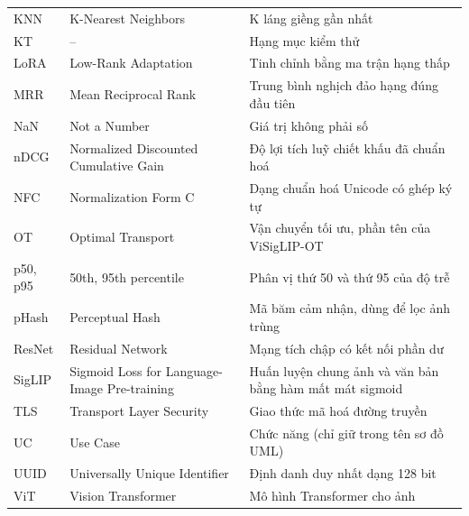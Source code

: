 \begin{longtable}{@{}L{2.3cm}L{5.9cm}L{6.8cm}@{}}
KNN & K-Nearest Neighbors & K láng giềng gần nhất \\
KT & -- & Hạng mục kiểm thử \\
LoRA & Low-Rank Adaptation & Tinh chỉnh bằng ma trận hạng thấp \\
MRR & Mean Reciprocal Rank & Trung bình nghịch đảo hạng đúng đầu tiên \\
NaN & Not a Number & Giá trị không phải số \\
nDCG & Normalized Discounted Cumulative Gain & Độ lợi tích luỹ chiết khấu đã chuẩn hoá \\
NFC & Normalization Form C & Dạng chuẩn hoá Unicode có ghép ký tự \\
OT & Optimal Transport & Vận chuyển tối ưu, phần tên của ViSigLIP-OT \\
p50, p95 & 50th, 95th percentile & Phân vị thứ 50 và thứ 95 của độ trễ \\
pHash & Perceptual Hash & Mã băm cảm nhận, dùng để lọc ảnh trùng \\
ResNet & Residual Network & Mạng tích chập có kết nối phần dư \\
SigLIP & Sigmoid Loss for Language-Image Pre-training & Huấn luyện chung ảnh và văn bản bằng hàm mất mát sigmoid \\
TLS & Transport Layer Security & Giao thức mã hoá đường truyền \\
UC & Use Case & Chức năng (chỉ giữ trong tên sơ đồ UML) \\
UUID & Universally Unique Identifier & Định danh duy nhất dạng 128 bit \\
ViT & Vision Transformer & Mô hình Transformer cho ảnh \\
\end{longtable}
\endgroup
